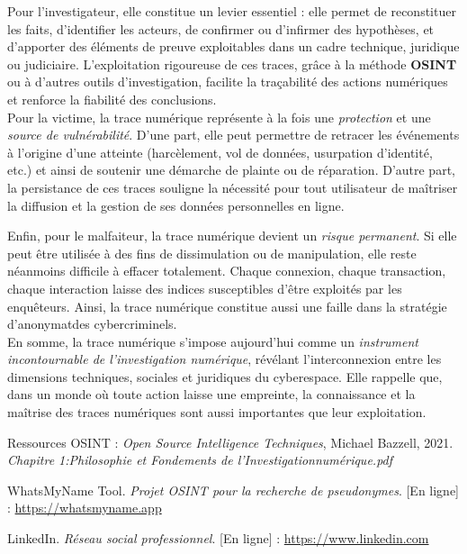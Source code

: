 \documentclass[memoire,12pt]{report}
\begin{document}
Pour l’investigateur, elle constitue un levier essentiel : elle permet de reconstituer les faits, d’identifier les acteurs, de confirmer ou d’infirmer des hypothèses, et d’apporter des éléments de preuve exploitables dans un cadre technique, juridique ou judiciaire. L’exploitation rigoureuse de ces traces, grâce à la méthode \textbf{OSINT} ou à d’autres outils d’investigation, facilite la traçabilité des actions numériques et renforce la fiabilité des conclusions.\\

Pour la victime, la trace numérique représente à la fois une \textit{protection} et une \textit{source de vulnérabilité}. D’une part, elle peut permettre de retracer les événements à l’origine d’une atteinte (harcèlement, vol de données, usurpation d’identité, etc.) et ainsi de soutenir une démarche de plainte ou de réparation. D’autre part, la persistance de ces traces souligne la nécessité pour tout utilisateur de maîtriser la diffusion et la gestion de ses données personnelles en ligne.

Enfin, pour le malfaiteur, la trace numérique devient un \textit{risque permanent}. Si elle peut être utilisée à des fins de dissimulation ou de manipulation, elle reste néanmoins difficile à effacer totalement. Chaque connexion, chaque transaction, chaque interaction laisse des indices susceptibles d’être exploités par les enquêteurs. Ainsi, la trace numérique constitue aussi une faille dans la stratégie d’anonymatdes cybercriminels.\\

En somme, la trace numérique s’impose aujourd’hui comme un \textit{instrument incontournable de l’investigation numérique}, révélant l’interconnexion entre les dimensions techniques, sociales et juridiques du cyberespace. Elle rappelle que, dans un monde où toute action laisse une empreinte, la connaissance et la maîtrise des traces numériques sont aussi importantes que leur exploitation.

\begin{thebibliography}
Ressources OSINT : \textit{Open Source Intelligence Techniques}, Michael Bazzell, 2021.
 \textit{Chapitre 1:Philosophie et Fondements de l'Investigationnumérique.pdf}
 
WhatsMyName Tool. \textit{Projet OSINT pour la recherche de pseudonymes}. [En ligne] : \url{https://whatsmyname.app}

LinkedIn. \textit{Réseau social professionnel}. [En ligne] : \url{https://www.linkedin.com}

\end{thebibliography}
\end{document}
